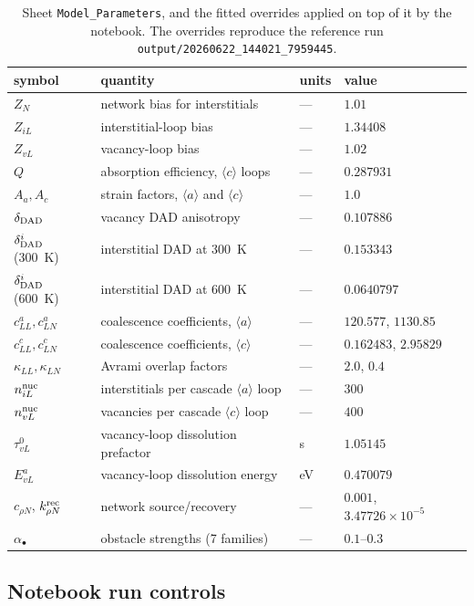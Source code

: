 \documentclass[11pt]{article}
\newcommand{\aloop}{\ensuremath{\langle a\rangle}}
\newcommand{\cloop}{\ensuremath{\langle c\rangle}}
\newcommand{\file}[1]{\texttt{\footnotesize #1}}
\begin{document}
\begin{table}[htbp]
\centering
\caption{Sheet \texttt{Model\_Parameters}, and the fitted overrides applied on
top of it by the notebook. The overrides reproduce the reference run
\file{output/20260622\_144021\_7959445}.}
\label{tab:model}
\begin{tabular}{@{}llll@{}}
\toprule
symbol & quantity & units & value \\
\midrule
$Z_N$      & network bias for interstitials & --- & $1.01$ \\
$Z_{iL}$   & interstitial-loop bias & --- & $1.34408$ \\
$Z_{vL}$   & vacancy-loop bias & --- & $1.02$ \\
$Q$        & absorption efficiency, \cloop{} loops & --- & $0.287931$ \\
$A_a, A_c$ & strain factors, \aloop{} and \cloop{} & --- & $1.0$ \\
$\delta_{\rm DAD}$ & vacancy DAD anisotropy & --- & $0.107886$ \\
$\delta^i_{\rm DAD}$(300~K) & interstitial DAD at 300~K & --- & $0.153343$ \\
$\delta^i_{\rm DAD}$(600~K) & interstitial DAD at 600~K & --- & $0.0640797$ \\
$c_{LL}^{a}, c_{LN}^{a}$ & coalescence coefficients, \aloop{} & --- & $120.577$, $1130.85$ \\
$c_{LL}^{c}, c_{LN}^{c}$ & coalescence coefficients, \cloop{} & --- & $0.162483$, $2.95829$ \\
$\kappa_{LL}, \kappa_{LN}$ & Avrami overlap factors & --- & $2.0$, $0.4$ \\
$n^{\rm nuc}_{iL}$ & interstitials per cascade \aloop{} loop & --- & $300$ \\
$n^{\rm nuc}_{vL}$ & vacancies per cascade \cloop{} loop & --- & $400$ \\
$\tau^{0}_{vL}$ & vacancy-loop dissolution prefactor & s & $1.05145$ \\
$E^a_{vL}$ & vacancy-loop dissolution energy & eV & $0.470079$ \\
$c_{\rho N}$, $k_{\rho N}^{\rm rec}$ & network source/recovery & --- & $0.001$, $3.47726\times10^{-5}$ \\
$\alpha_{\bullet}$ & obstacle strengths (7 families) & --- & $0.1$--$0.3$ \\
\bottomrule
\end{tabular}
\end{table}

\subsection{Notebook run controls}
\end{document}
